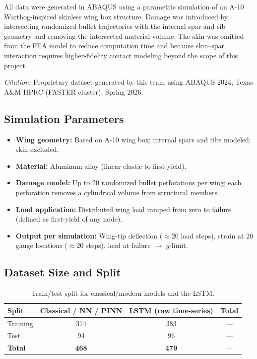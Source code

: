 \documentclass[10pt,letterpaper]{article}
\begin{document}
All data were generated in ABAQUS using a parametric simulation of an A-10
Warthog-inspired skinless wing box structure. Damage was introduced by intersecting
randomized bullet trajectories with the internal spar and rib geometry and removing the
intersected material volume. The skin was omitted from the FEA model to reduce computation
time and because skin--spar interaction requires higher-fidelity contact modeling beyond the
scope of this project.

\textit{Citation:} Proprietary dataset generated by this team using ABAQUS 2024, Texas A\&M
HPRC (FASTER cluster), Spring 2026.

\subsection{Simulation Parameters}

\begin{itemize}
  \item \textbf{Wing geometry:} Based on A-10 wing box; internal spars and ribs modeled;
    skin excluded.
  \item \textbf{Material:} Aluminum alloy (linear elastic to first yield).
  \item \textbf{Damage model:} Up to 20 randomized bullet perforations per wing; each
    perforation removes a cylindrical volume from structural members.
  \item \textbf{Load application:} Distributed wing load ramped from zero to failure
    (defined as first-yield of any node).
  \item \textbf{Output per simulation:} Wing-tip deflection ($\approx$20 load steps),
    strain at 20 gauge locations ($\approx$20 steps), load at failure $\rightarrow$
    $g$-limit.
\end{itemize}

\subsection{Dataset Size and Split}

\begin{table}[H]
  \caption{Train/test split for classical/modern models and the LSTM.}
  \label{tab:split}
  \centering
  \begin{tabular}{@{}lccc@{}}
    \toprule
    \textbf{Split} & \textbf{Classical / NN / PINN} & \textbf{LSTM (raw time-series)}
      & \textbf{Total} \\
    \midrule
    Training & 374 & 383 & --- \\
    Test     &  94 &  96 & --- \\
    \textbf{Total} & \textbf{468} & \textbf{479} & --- \\
    \bottomrule
  \end{tabular}
\end{table}
\end{document}
